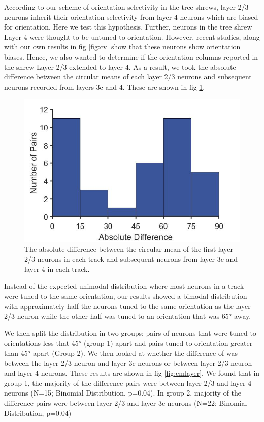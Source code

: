 According to our scheme of orientation selectivity in the tree shrews, layer 2/3 neurons inherit their orientation selectivity from layer 4 neurons which are biased for orientation. Here we test this hypothesis. Further, neurons in the tree shrew Layer 4 were thought to be untuned to orientation. However, recent studies, along with our own results in fig \ref{fig:cv} show that these neurons show orientation biases. Hence, we also wanted to determine if the orientation columns reported in the shrew Layer 2/3 extended to layer 4. As a result, we took the absolute difference between the circular means of each layer 2/3 neurons and subsequent neurons recorded from layers 3c and 4. These are shown in fig \ref{fig:cmdiff}.
	\begin{figure}[H]
	
	\includegraphics[width=\linewidth]{ShrewV1/cmdiff.jpg}
	\caption{The absolute difference between the circular mean of the first layer 2/3 neurons in each track and subsequent neurons from layer 3c and layer 4 in each track.}
	\label{fig:cmdiff}
	\end{figure}

Instead of the expected unimodal distribution where most neurons in a track were tuned to the same orientation, our results showed a bimodal distribution with approximately half the neurons tuned to the same orientation as the layer 2/3 neuron while the other half was tuned to an orientation that was 65$^o$ away.

We then split the distribution in two groups: pairs of neurons that were tuned to orientations less that 45$^o$ (group 1) apart and pairs tuned to orientation greater than 45$^o$ apart (Group 2). We then looked at whether the difference of was between the layer 2/3 neuron and layer 3c neurons or between layer 2/3 neuron and layer 4 neurons. These results are shown in fig \ref{fig:cmlayer}. We found that in group 1, the majority of the difference pairs were between layer 2/3 and layer 4 neurons (N=15; Binomial Distribution, p=0.04). In group 2, majority of the difference pairs were between layer 2/3 and layer 3c neurons (N=22; Binomial Distribution, p=0.04)

